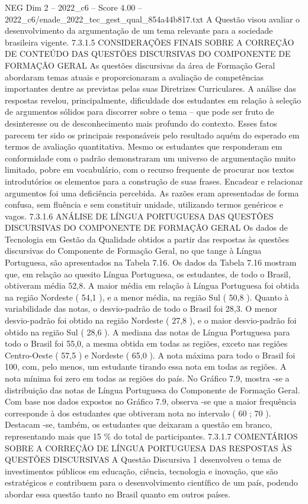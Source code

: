 \begin{textsample}{NEG Dim 2 – 2022\_c6 – Score 4.00 – 2022\_c6/enade\_2022\_tec\_gest\_qual\_854a44b817.txt}
A Questão visou avaliar o desenvolvimento da argumentação de um tema relevante para a sociedade brasileira vigente. 7.3.1.5 CONSIDERAÇÕES FINAIS SOBRE A CORREÇÃO DE CONTEÚDO DAS QUESTÕES DISCURSIVAS DO COMPONENTE DE FORMAÇÃO GERAL As questões discursivas da área de Formação Geral abordaram temas atuais e proporcionaram a avaliação de competências importantes dentre as previstas pelas suas Diretrizes Curriculares.
A análise das respostas revelou, principalmente, dificuldade dos estudantes em relação à seleção de argumentos sólidos para discorrer sobre o tema – que pode ser fruto de desinteresse ou de desconhecimento mais profundo do contexto.
Esses fatos parecem ter sido os principais responsáveis pelo resultado aquém do esperado em termos de avaliação quantitativa.
Mesmo os estudantes que responderam em conformidade com o padrão demonstraram um universo de argumentação muito limitado, pobre em vocabulário, com o recurso frequente de procurar nos textos introdutórios os elementos para a construção de suas frases.
Encadear e relacionar argumentos foi uma deficiência percebida.
As razões eram apresentadas de forma confusa, sem fluência e sem constituir unidade, utilizando termos genéricos e vagos. 7.3.1.6 ANÁLISE DE LÍNGUA PORTUGUESA DAS QUESTÕES DISCURSIVAS DO COMPONENTE DE FORMAÇÃO GERAL Os dados de Tecnologia em Gestão da Qualidade obtidos a partir das respostas às questões discursivas do Componente de Formação Geral, no que tange à Língua Portuguesa, são apresentados na Tabela 7.16.
Os dados da Tabela 7.16 mostram que, em relação ao quesito Língua Portuguesa, os estudantes, de todo o Brasil, obtiveram média 52,8.
A maior média em relação à Língua Portuguesa foi obtida na região Nordeste ( 54,1 ), e a menor média, na região Sul ( 50,8 ).
Quanto à variabilidade das notas, o desvio-padrão de todo o Brasil foi 28,3.
O menor desvio-padrão foi obtido na região Nordeste ( 27,8 ), e o maior desvio-padrão foi obtido na região Sul ( 28,6 ).
A mediana das notas de Língua Portuguesa para todo o Brasil foi 55,0, a mesma obtida em todas as regiões, exceto nas regiões Centro-Oeste ( 57,5 ) e Nordeste ( 65,0 ).
A nota máxima para todo o Brasil foi 100, com, pelo menos, um estudante tirando essa nota em todas as regiões.
A nota mínima foi zero em todas as regiões do país.
No Gráfico 7.9, mostra -se a distribuição das notas de Língua Portuguesa do Componente de Formação Geral.
Com base nos dados expostos no Gráfico 7.9, observa -se que a maior frequência corresponde à dos estudantes que obtiveram nota no intervalo ( 60 ; 70 ).
Destacam -se, também, os estudantes que deixaram a questão em branco, representando mais que 15 \% do total de participantes. 7.3.1.7 COMENTÁRIOS SOBRE A CORREÇÃO DE LÍNGUA PORTUGUESA DAS RESPOSTAS ÀS QUESTÕES DISCURSIVAS A Questão Discursiva 1 desenvolveu o tema de investimentos públicos em educação, ciência, tecnologia e inovação, que são estratégicos e contribuem para o desenvolvimento científico de um país, podendo abordar essa questão tanto no Brasil quanto em outros países.

\end{textsample}
